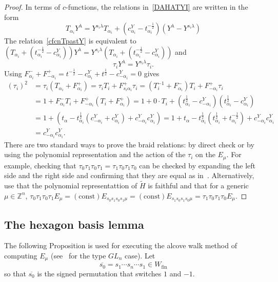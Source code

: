 \documentclass[11pt]{article}
\theoremstyle{plain}
\theoremstyle{definition}
\theoremstyle{remark}
\numberwithin{equation}{section}
\def\ZZ{\mathbb{Z}}
\newcounter{r}
\newcounter{s}
\begin{document}
\begin{proof}
In terms of $c$-functions, the relations in~\eqref{DAHATYI} are written in the form
\begin{equation}
T_{\alpha_i} Y^{\lambda} 
= Y^{s_i\lambda} T_{\alpha_i} + (c_{\alpha_i}^Y-t_{\alpha_i}^{-\frac12}) 
(Y^{\lambda} - Y^{s_i \lambda} )
\label{cfcnTpastY}
\end{equation}
The relation~\eqref{cfcnTpastY} is equivalent to
$
(T_{\alpha_i} +  (t_{\alpha_i}^{-\frac12}- c_{\alpha_i}^Y)) Y^{\lambda}
= Y^{s_i\lambda} (T_{\alpha_i} + (t_{\alpha_i}^{-\frac12} - c_{\alpha_i}^Y))
$
and
$$
\tau_i Y^{\lambda} = Y^{s_i\lambda}\tau_i.
$$
Using
$F^-_{\alpha_i}+F^+_{-\alpha_i} = t^{-\frac12} - c^Y_{\alpha_i} +t^{\frac12} - c^Y_{-\alpha_i} = 0$ gives
\begin{align*}
(\tau_i)^2 
&= \tau_i (T_{\alpha_i}+F^+_{\alpha_i})
= \tau_i T_i + F^+_{s_i\alpha_i} \tau_i 
=(T_i^{-1}+F^-_{\alpha_i})T_i + F^+_{-\alpha_i} \tau_i \\
&=1+F^-_{\alpha_i}T_i + F^+_{-\alpha_i}
(T_i + F^+_{\alpha_i})
=1+0\cdot T_i+(t^{\frac12}_{\alpha_i}-c^Y_{-\alpha_i})(t^{\frac12}_{\alpha_i}-c^Y_{\alpha_i})
\\
&=1+(t_{\alpha}-t^{\frac12}_{\alpha_i}(c^Y_{-\alpha_i}+c^Y_{\alpha_i})+
c^Y_{-\alpha_i}c^Y_{\alpha_i})
=1+t_{\alpha}-t^{\frac12}_{\alpha_i}(t^{\frac12}_{\alpha_i}+t^{-\frac12}_{\alpha_i})
+c^Y_{-\alpha_i}c^Y_{\alpha_i}
\\
&=c^Y_{-\alpha_i}c^Y_{\alpha_i}.
\end{align*}
There are two standard ways to prove the braid relations: by direct check or by using the polynomial representation
and the action of the $\tau_i$ on the $E_\mu$.  For example, checking that
$\tau_0\tau_1\tau_0\tau_1 = \tau_1\tau_0\tau_1\tau_0$ can be checked
by expanding the left side and the right side and confirming that they are equal as in~\cite[(5.5.2) and (5.6.4)]{Mac03}.
Alternatively, use that the polynomial representattion of $\widetilde H$ is faithful and that for a generic $\mu\in \ZZ^n$,
$\tau_0\tau_1\tau_0\tau_1 E_\mu = (\mathrm{const})E_{s_0s_1s_0s_1\mu} = (\mathrm{const})E_{s_1s_0s_1s_0\mu} =
\tau_1\tau_0\tau_1\tau_0E_\mu$.
\end{proof}


\subsection{The hexagon basis lemma}

The following Proposition is used for executing the alcove walk method of computing $E_\mu$
(see~\cite[Proposition 5.3]{GR21} for the type $GL_n$ case).  Let
$$\overline{s_0} = s_1\cdots s_n \cdots s_1\in W_{\mathrm{fin}} 
$$
so that $\overline{s_0}$ is the signed permutation that switches $1$ and $-1$.
\end{document}
